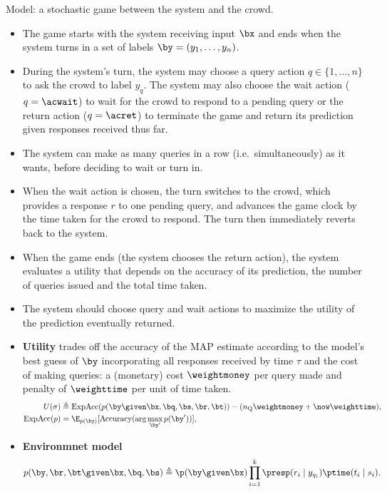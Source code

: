\begin{block}{Model: a stochastic game between the system and the crowd.}
  \begin{itemize}
    \item The game starts with the system receiving input $\bx$ and ends when the system turns in a set of labels $\by = (y_1, \ldots, y_n)$. 
    \item During the system's turn, the system may choose a query action $q \in \{1, \ldots, n\}$ to ask the crowd to label $y_q$. The system may also choose 
the wait action ($q = \acwait$) to wait for the crowd to respond to a pending query
or
the return action ($q = \acret$) to terminate the game and return its prediction given responses received thus far.
\item
The system can make as many queries in a row (i.e.\ simultaneously) as it wants, before deciding to wait or turn in.
\item When the wait action is chosen, the turn switches to the crowd, which provides a response $r$ to one pending query, and advances the game clock by the time taken for the crowd to respond. The turn then immediately reverts back to the system.
\item When the game ends (the system chooses the return action), the system evaluates a utility that depends on the accuracy of its prediction,
the number of queries issued and the total time taken.
\item The system should choose query and wait actions to
maximize the utility of the prediction eventually returned.
\item \textbf{Utility} trades off the accuracy of the MAP estimate according to the model's best guess of $\by$ incorporating all responses received by time $\tau$ and the cost of making queries: a (monetary) cost $\weightmoney$ per query made and penalty of $\weighttime$ per unit of time taken.
\begin{align}
  \label{eqn:utility}
  U(\sigma) &\eqdef \text{ExpAcc}(p(\by \given \bx, \bq, \bs, \br, \bt)) - (n_\text{Q} \weightmoney + \now \weighttime), \\
  \text{ExpAcc}(p) &= \E_{p(\by)}[\text{Accuracy}(\arg\max_{\by'} p(\by'))],
\end{align}
\item \textbf{Environmnet model}
\begin{align}
  \label{eqn:dynamics}
p(\by, \br, \bt \given \bx, \bq, \bs) \eqdef \p(\by \given \bx) \prod_{i=1}^k \presp(r_i \mid y_{q_i}) \ptime(t_i \mid s_i).
\end{align}

  \end{itemize}
\end{block}

